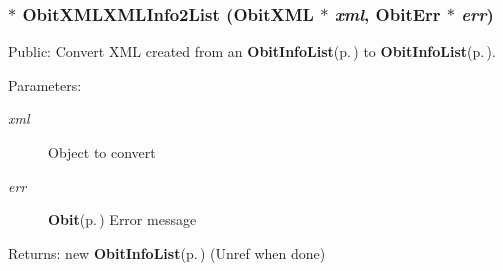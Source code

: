 \subsubsection{$\ast$ Obit\-XMLXMLInfo2List ({\bf Obit\-XML} $\ast$ {\em xml}, {\bf Obit\-Err} $\ast$ {\em err})}\label{ObitXML_8h_a25}


Public: Convert XML created from an {\bf Obit\-Info\-List}{\rm (p.\,\pageref{structObitInfoList})} to {\bf Obit\-Info\-List}{\rm (p.\,\pageref{structObitInfoList})}. 

\begin{Desc}
\item[Parameters:]
\begin{description}
\item[{\em xml}]Object to convert \item[{\em err}]{\bf Obit}{\rm (p.\,\pageref{structObit})} Error message \end{description}
\end{Desc}
\begin{Desc}
\item[Returns:]new {\bf Obit\-Info\-List}{\rm (p.\,\pageref{structObitInfoList})} (Unref when done) \end{Desc}
